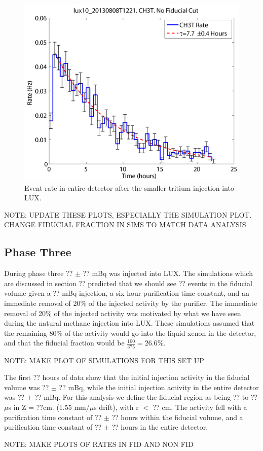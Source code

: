 \begin{figure}[H]
\centering
\includegraphics[scale=0.22]{CH3T_no_fid_rate_new.png}
\caption{Event rate in entire detector after the smaller tritium injection into LUX.}
\label{fig:NoFidRate}
\end{figure}


NOTE: UPDATE THESE PLOTS, ESPECIALLY THE SIMULATION PLOT.  CHANGE FIDUCIAL FRACTION IN SIMS TO MATCH DATA ANALYSIS

\subsection{Phase Three}

During phase three ?? $\pm$ ?? mBq was injected into LUX.  The simulations which are discussed in section ?? predicted that we should see ?? events in the fiducial volume given a ?? mBq injection, a six hour purification time constant, and an immediate removal of 20\% of the injected activity by the purifier.  The immediate removal of 20\% of the injected activity was motivated by what we have seen during the natural methane injection into LUX.  These simulations assumed that the remaining 80\% of the activity would go into the liquid xenon in the detector, and that the fiducial fraction would be $\frac{100}{375}=26.6\%$.


NOTE: MAKE PLOT OF SIMULATIONS FOR THIS SET UP

The first ?? hours of data show that the initial injection activity in the fiducial volume was ?? $\pm$ ?? mBq, while the initial injection activity in the entire detector was ?? $\pm$ ?? mBq.  For this analysis we define the fiducial region as being ?? to ?? $\mu$s in Z =  ??cm. (1.55 mm/$\mu$s drift), with r $<$ ?? cm. The activity fell with a purification time constant of ?? $\pm$ ?? hours within the fiducial volume, and a purification time constant of ?? $\pm$ ?? hours in the entire detector.  


NOTE: MAKE PLOTS OF RATES IN FID AND NON FID
